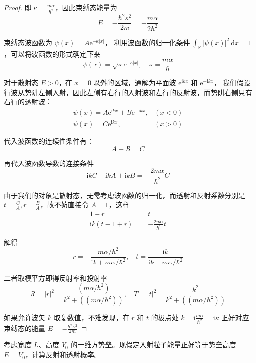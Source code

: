 \begin{proof}
即 $\kappa=\frac{m \alpha}{\hbar^{2}}$，因此束缚态能量为
$$E=-\frac{\hbar^{2} \kappa^{2}}{2 m}=-\frac{m \alpha}{2 \hbar^{2}}$$

束缚态波函数为 $\psi(x)=A \mathrm{e}^{-\kappa|x|}$，
利用波函数的归一化条件 $\int_{\mathbb{R}}|\psi(x)|^{2} \mathrm{~d} x=1$，可以将波函数的形式确定下来
$$\psi(x)=\sqrt{\kappa} \mathrm{e}^{-\kappa|x|}, 
\quad \kappa=\frac{m \alpha}{\hbar}$$

对于散射态 $E>0$，在 $x=0$ 以外的区域，通解为平面波 $\mathrm{e}^{\mathrm{i} k x}$ 和 $\mathrm{e}^{-\mathrm{i} k x}$，
我们假设行波从势阱左侧入射，因此左侧有右行的入射波和左行的反射波，而势阱右侧只有右行的透射波：
$$
\begin{array}{ll}
\psi(x)=A \mathrm{e}^{\mathrm{i} k x}+B \mathrm{e}^{-\mathrm{i} k x}, & (x<0) \\
\psi(x)=C \mathrm{e}^{\mathrm{i} k x}, & (x>0)
\end{array}
$$

代入波函数的连续性条件有：
$$A+B=C$$

再代入波函数导数的连接条件
$$\mathrm{i} k C-\mathrm{i} k A+\mathrm{i} k B=-\frac{2 m \alpha}{\hbar^{2}} C$$

由于我们的对象是散射态，无需考虑波函数的归一化，而透射和反射系数分别是 $t=\frac{C}{A}, r=\frac{B}{A}$，故不妨直接令 $A=1$，这样
$$
\begin{aligned}
1+r & =t \\
\mathrm{i} k(t-1+r) & =-\frac{2 m \alpha}{\hbar^{2}} t
\end{aligned}
$$

解得
$$r=-\frac{m \alpha / \hbar^{2}}{\mathrm{i} k+m \alpha / \hbar^{2}}, 
\quad t=\frac{\mathrm{i} k}{\mathrm{i} k+m \alpha / \hbar^{2}}$$

二者取模平方即得反射率和投射率
$$R=|r|^{2}=\frac{\left(m \alpha / \hbar^{2}\right)}{k^{2}+\left(\left(m \alpha / \hbar^{2}\right)\right)}, 
\quad T=|t|^{2}=\frac{k^{2}}{k^{2}+\left(\left(m \alpha / \hbar^{2}\right)\right)}$$

如果允许波矢 $k$ 取复数值，不难发现，在 $r$ 和 $t$ 的极点处 $k=\mathrm{i} \frac{m \alpha}{\hbar^{2}}=\mathrm{i} \kappa$ 正好对应束缚态的能量 $E=-\frac{\hbar^{2} \kappa^{2}}{2 m}$
\end{proof}
\begin{2}
    考虑宽度 $L$、高度 $V_{0}$ 的一维方势垒。现假定入射粒子能量正好等于势垒高度 $E=V_{0}$，计算反射和透射概率。
\end{2}
